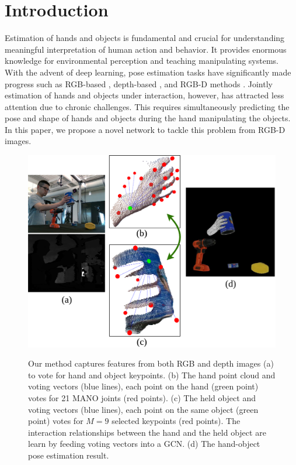 \section{Introduction}
\label{sec:intro} 
Estimation of hands and objects is fundamental and crucial for understanding meaningful interpretation of human action and
behavior. It provides enormous knowledge for environmental perception and teaching manipulating systems. With the advent of deep learning, pose estimation tasks have significantly made progress such as RGB-based \cite{cai20203d, zimmermann2017learning, gao2019variational, xiang2017posecnn, tremblay2018deep}, depth-based \cite{oberweger2017deepprior++, moon2018v2v, xiong2019a2j, ge20173d, cai2022ove6d, li2020category}, and RGB-D methods \cite{kazakos2018fusion, yuan20193d}. Jointly estimation of hands and objects under interaction, however, has attracted less attention due to chronic challenges. This requires simultaneously predicting the pose and shape of hands and objects during the hand manipulating the objects. In this paper, we propose a novel network to tackle this problem from RGB-D images. 

\begin{figure}[t]
\center
\includegraphics[width=\linewidth]{Figs/project_overview.png}
\label{fig:result_exp}
\caption{Our method captures features from both RGB and depth images (a) to vote for hand and object keypoints. (b) The hand point cloud and voting vectors (blue lines), each point on the hand (green point) votes for 21 MANO joints (red points). (c) The held object and voting vectors (blue lines), each point on the same object (green point) votes for $M=9$ selected keypoints (red points). The interaction relationships between the hand and the held object are learn by feeding voting vectors into a GCN. (d) The hand-object pose estimation result.}
\end{figure}

